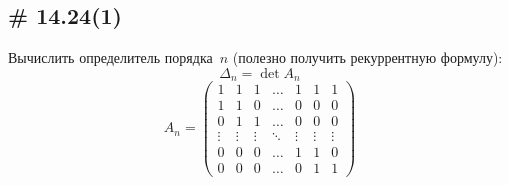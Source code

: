 \documentclass[a4paper,12pt]{article}
\theoremstyle{remark}
\begin{document}
  
  \subsection{\# 14.24(1)}
  
  Вычислить определитель порядка~$n$ (полезно получить рекуррентную формулу):
  \[
    \Delta_n = \det A_n
  \]
  \[
    A_n = \begin{pmatrix}
      1      & 1      & 1      & \ldots & 1      & 1      & 1\\
      1      & 1      & 0      & \ldots & 0      & 0      & 0\\
      0      & 1      & 1      & \ldots & 0      & 0      & 0\\
      \vdots & \vdots & \vdots & \ddots & \vdots & \vdots & \vdots\\
      0      & 0      & 0      & \ldots & 1      & 1      & 0\\
      0      & 0      & 0      & \ldots & 0      & 1      & 1
    \end{pmatrix}
  \]
  
\end{document}
